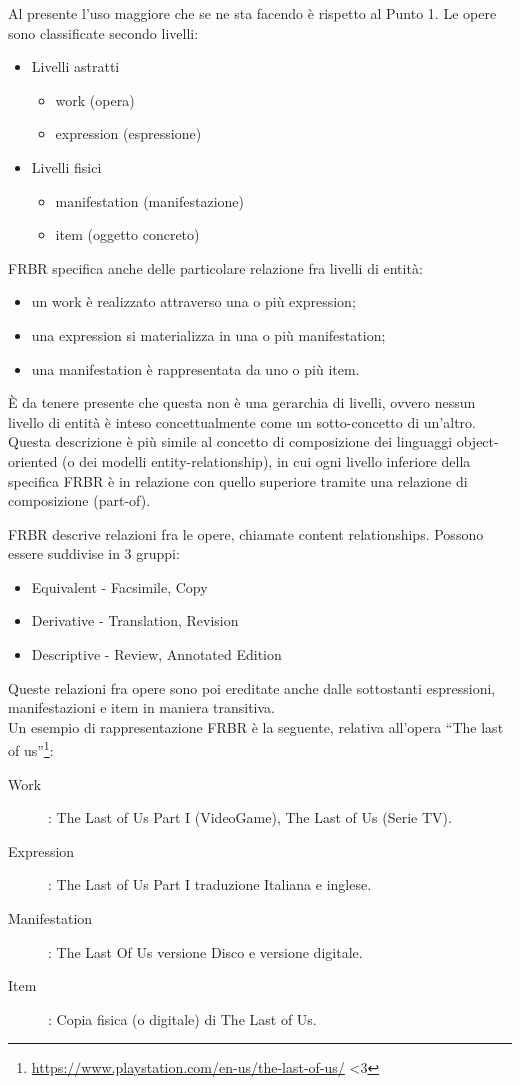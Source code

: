 Al presente l'uso maggiore che se ne sta facendo è rispetto al Punto 1. Le opere sono classificate secondo livelli:
\begin{itemize}
    \item Livelli astratti
        \begin{itemize}
            \item work (opera)
            \item expression (espressione)
        \end{itemize}
    \item Livelli fisici
        \begin{itemize}
            \item manifestation (manifestazione)
            \item item (oggetto concreto)
        \end{itemize}
\end{itemize}
FRBR specifica anche delle particolare relazione fra livelli di entità:
\begin{itemize}
    \item un work è realizzato attraverso una o più expression;
    \item una expression si materializza in una o più manifestation;
    \item una manifestation è rappresentata da uno o più item.
\end{itemize}

È da tenere presente che questa non è una gerarchia di livelli, ovvero nessun livello di entità è inteso concettualmente come un sotto-concetto di un'altro. 
Questa descrizione è più simile al concetto di composizione dei linguaggi object-oriented (o dei modelli entity-relationship), in cui ogni livello inferiore 
della specifica FRBR è in relazione con quello superiore tramite una relazione di composizione (part-of).

FRBR descrive relazioni fra le opere, chiamate content relationships. Possono essere suddivise in 3 gruppi:
\begin{itemize}
    \item Equivalent - Facsimile, Copy
    \item Derivative - Translation, Revision
    \item Descriptive - Review, Annotated Edition
\end{itemize}
Queste relazioni fra opere sono poi ereditate anche dalle sottostanti espressioni, manifestazioni e item in maniera transitiva.
\\
Un esempio di rappresentazione FRBR è la seguente, relativa all'opera “The last of us”\footnote{\url{https://www.playstation.com/en-us/the-last-of-us/} <3}:
\begin{description}
    \item[Work]: The Last of Us Part I (VideoGame), The Last of Us (Serie TV).
    \item[Expression]: The Last of Us Part I traduzione Italiana e inglese.
    \item[Manifestation]:  The Last Of Us versione Disco e versione digitale.
    \item[Item]: Copia fisica (o digitale) di The Last of Us.
\end{description}


